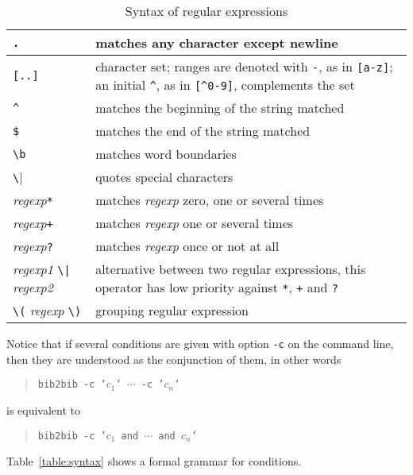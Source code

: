 \documentclass[11pt,a4paper]{article}
\begin{document}
\begin{table}[t]
\begin{center}
\begin{tabular}{|l|p{100mm}|}
\hline
\verb|.| & matches any character except newline \\\hline
\verb|[..]| & character set; ranges are denoted with \verb|-|, as in
\verb|[a-z]|; an initial \verb|^|, as in \verb|[^0-9]|, complements
the set \\\hline 
\verb|^| & matches the beginning of the string matched \\\hline
\verb|$| & matches the end of the string matched \\\hline
\verb|\b| & matches word boundaries \\\hline
\verb|\| & quotes special characters \\\hline
\textsl{regexp}\verb|*| & matches \textsl{regexp} zero, one or several
times \\\hline 
\textsl{regexp}\verb|+| & matches \textsl{regexp} one or several times
\\\hline 
\textsl{regexp}\verb|?| & matches \textsl{regexp} once or not at all \\\hline
\textsl{regexp1} \verb+\|+ \textsl{regexp2} & alternative between two
regular expressions, this operator has low priority against
\verb|*|, \verb|+| and \verb|?| \\\hline
\verb|\(| \textsl{regexp} \verb|\)| & grouping regular expression \\\hline
\end{tabular} 
\end{center}
\caption{Syntax of regular expressions}
\label{table:regexp}
\end{table}

Notice that if several conditions are given with option \verb|-c| on
the command line, then they are understood as the conjunction of them,
in other words
\begin{quote}
\texttt{bib2bib -c '$c_1$' $\cdots$ -c '$c_n$'}
\end{quote} 
is equivalent to
\begin{quote}
\texttt{bib2bib -c '$c_1$ and $\cdots$ and $c_n$'}
\end{quote} 

Table~\ref{table:syntax} shows a formal grammar for conditions.
\end{document}
